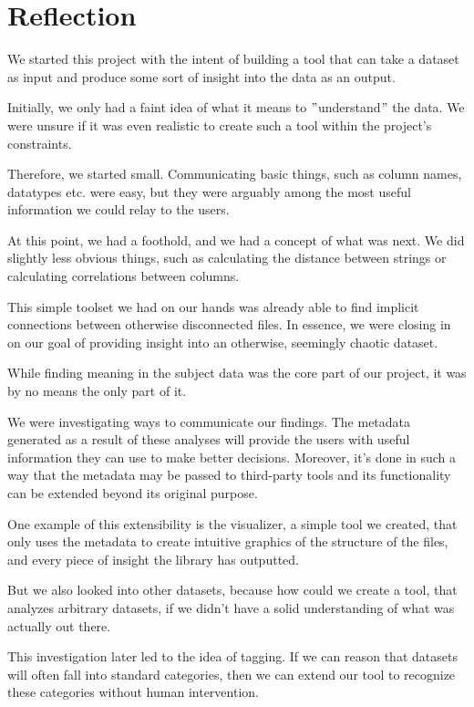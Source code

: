 \section{Reflection}
We started this project with the intent of building a tool that can take a dataset as input
and produce some sort of insight into the data as an output.

Initially, we only had a faint idea of what it means to \("\)understand\("\)
the data.
We were unsure if it was even realistic to create such a tool within the project's constraints.

Therefore, we started small.
Communicating basic things, such as column names, datatypes etc.
were easy, but they were arguably among the most useful information we could relay to the users.

At this point, we had a foothold, and we had a concept of what was next.
We did slightly less obvious things, such as calculating the distance between strings or
calculating correlations between columns.

This simple toolset we had on our hands was already able to find implicit connections between
otherwise disconnected files.
In essence, we were closing in on our goal of providing insight into an otherwise, seemingly chaotic
dataset.

While finding meaning in the subject data was the core part of our project,
it was by no means the only part of it.

We were investigating ways to communicate our findings.
The metadata generated as a result of these analyses will provide the users with useful information
they can use to make better decisions.
Moreover, it's done in such a way that the metadata may be passed to third-party tools and
its functionality can be extended beyond its original purpose.

One example of this extensibility is the visualizer, a simple tool we created, that only
uses the metadata to create intuitive graphics of the structure of the files, and
every piece of insight the library has outputted.

But we also looked into other datasets,
because how could we create a tool, that analyzes arbitrary datasets, if
we didn't have a solid understanding of what was actually out there.

This investigation later led to the idea of tagging.
If we can reason that datasets will often fall into standard categories,
then we can extend our tool to recognize these categories without human intervention.

